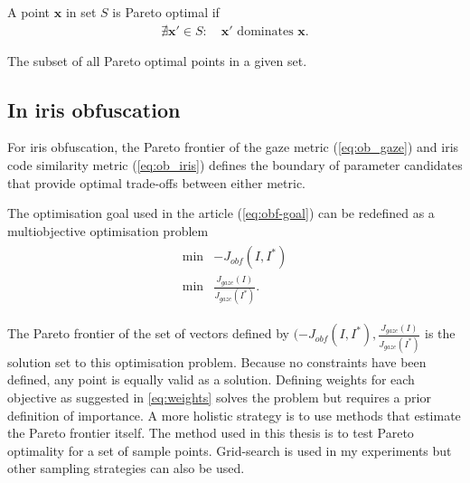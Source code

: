 \begin{definition}\label{def:p-optimal}
A point $\mathbf{x}$ in set $S$ is Pareto optimal if
\begin{align}
    \nexists \mathbf{x'} \in S: \quad \mathbf{x'} \text{ dominates } \mathbf{x}.
\end{align}
\end{definition}

\begin{definition}\label{def:p-frontier}
The subset of all Pareto optimal points in a given set.
\end{definition}

\subsection{In iris obfuscation}
For iris obfuscation, the Pareto frontier of the gaze metric (\cref{eq:ob_gaze}) and iris code similarity metric (\cref{eq:ob_iris}) defines the boundary of parameter candidates that provide optimal trade-offs between either metric.

The optimisation goal used in the article (\cref{eq:obf-goal}) can be redefined as a multiobjective optimisation problem
\begin{align}
	\begin{aligned}
    \min & - J_{obf}(I, I^*)\\
    \min & \frac{J_{gaze}(I)}{J_{gaze}(I^*)}.
\end{aligned}
\end{align}

The Pareto frontier of the set of vectors defined by $(- J_{obf}(I, I^*), \frac{J_{gaze}(I)}{J_{gaze}(I^*)}$ is the solution set to this optimisation problem. Because no constraints have been defined, any point is equally valid as a solution. Defining weights for each objective as suggested in \cref{eq:weights} solves the problem but requires a prior definition of importance. A more holistic strategy is to use methods that estimate the Pareto frontier itself. The method used in this thesis is to test Pareto optimality for a set of sample points. Grid-search is used in my experiments but other sampling strategies can also be used. 




